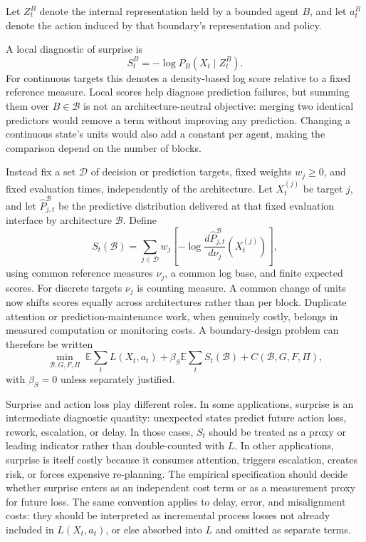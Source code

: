 \documentclass[11pt]{article}
\newcommand{\E}{\mathbb{E}}
\newcommand{\calB}{\mathcal{B}}
\begin{document}
Let \(Z_t^B\) denote the internal representation held by a bounded agent \(B\),
and let \(a_t^B\) denote the action induced by that boundary's representation
and policy.

A local diagnostic of surprise is
\[
S_t^B=-\log P_B(X_t\mid Z_t^B).
\]
For continuous targets this denotes a density-based log score relative to a
fixed reference measure. Local scores help diagnose prediction failures, but
summing them over $B\in\calB$ is not an architecture-neutral objective:
merging two identical predictors would remove a term without improving any
prediction. Changing a continuous state's units would also add a constant per
agent, making the comparison depend on the number of blocks.

Instead fix a set $\mathcal D$ of decision or prediction targets, fixed
weights $w_j\geq0$, and fixed evaluation times, independently of the
architecture. Let $X_t^{(j)}$ be target $j$, and let
$\widehat P_{j,t}^{\calB}$ be the predictive distribution delivered at that
fixed evaluation interface by architecture $\calB$. Define
\[
S_t(\calB)=\sum_{j\in\mathcal D}w_j
\left[-\log\frac{d\widehat P_{j,t}^{\calB}}{d\nu_j}
                  (X_t^{(j)})\right],
\]
using common reference measures $\nu_j$, a common log base, and finite
expected scores. For discrete targets $\nu_j$ is counting measure. A common
change of units now shifts scores equally across architectures rather than
per block. Duplicate attention or prediction-maintenance work, when genuinely
costly, belongs in measured computation or monitoring costs. A boundary-design
problem can therefore be written
\[
\min_{\calB,G,F,\Pi}\;
\E\sum_t L(X_t,a_t)+\beta_S\E\sum_t S_t(\calB)
+C(\calB,G,F,\Pi),
\]
with $\beta_S=0$ unless separately justified.

Surprise and action loss play different roles. In some applications, surprise
is an intermediate diagnostic quantity: unexpected states predict future
action loss, rework, escalation, or delay. In those cases, \(S_t\) should be
treated as a proxy or leading indicator rather than double-counted with \(L\).
In other applications, surprise is itself costly because it consumes attention,
triggers escalation, creates risk, or forces expensive re-planning. The
empirical specification should decide whether surprise enters as an independent
cost term or as a measurement proxy for future loss. The same convention
applies to delay, error, and misalignment costs: they should be interpreted as
incremental process losses not already included in \(L(X_t,a_t)\), or else
absorbed into \(L\) and omitted as separate terms.
\end{document}
